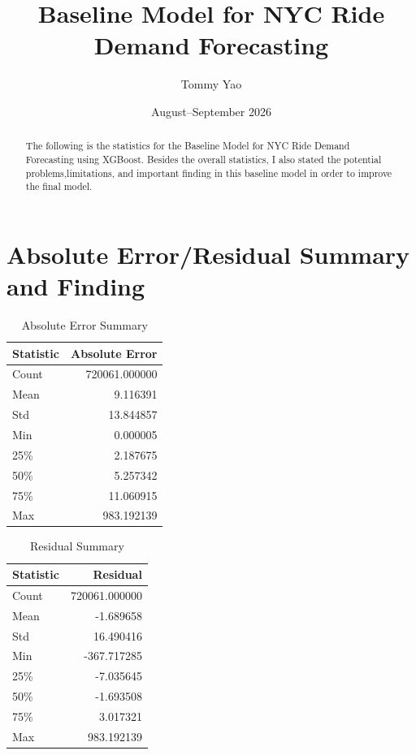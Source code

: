 \documentclass{article}
\title{Baseline Model for NYC Ride Demand Forecasting}
\author{Tommy Yao}
\date{August--September 2026}
\begin{document}
\maketitle

\begin{abstract}
The following is the statistics for the Baseline Model for NYC Ride Demand Forecasting using XGBoost. Besides the overall statistics,
I also stated the potential problems,limitations, and important finding in this baseline model in order to improve the final model.

\end{abstract}
\section{Absolute Error/Residual Summary and Finding}

\begin{table}[H]
\centering
\caption{Absolute Error Summary}
\begin{tabular}{lr}
\hline
Statistic & Absolute Error \\
\hline
Count & 720061.000000 \\
Mean  & 9.116391 \\
Std   & 13.844857 \\
Min   & 0.000005 \\
25\%  & 2.187675 \\
50\%  & 5.257342 \\
75\%  & 11.060915 \\
Max   & 983.192139 \\
\hline
\end{tabular}
\end{table}

\begin{table}[H]
\centering
\caption{Residual Summary}
\begin{tabular}{lr}
\hline
Statistic & Residual \\
\hline
Count & 720061.000000 \\
Mean  & -1.689658 \\
Std   & 16.490416 \\
Min   & -367.717285 \\
25\%  & -7.035645 \\
50\%  & -1.693508 \\
75\%  & 3.017321 \\
Max   & 983.192139 \\
\hline
\end{tabular}
\end{table}
\end{document}
